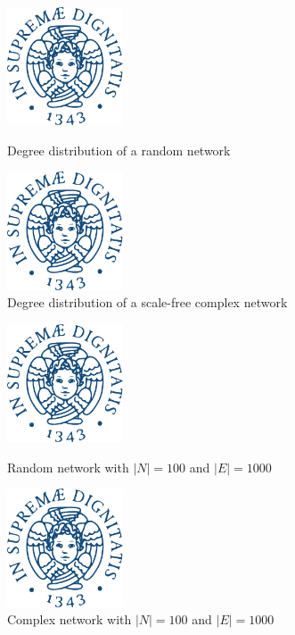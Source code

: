 \begin{figure}[h]
	\centering
	\begin{minipage}[t]{.45\textwidth}
		\centering
		\includegraphics[width=.8\textwidth,height=3.5cm]{figure/cherubino} %
		\caption{Degree distribution of a random network}
	\end{minipage}\hfill
	\begin{minipage}[t]{.45\textwidth}
		\centering
		\includegraphics[width=.8\textwidth,height=3.5cm]{figure/cherubino} %
		\caption{Degree distribution of a scale-free complex network}
	\end{minipage}
\end{figure}

\begin{figure}[h]
	\centering
	\begin{minipage}[t]{.45\textwidth}
		\centering
		\includegraphics[width=.8\textwidth,height=3.5cm]{figure/cherubino} %
		\caption{Random network with $|N| = 100$ and $|E| = 1000$}
	\end{minipage}\hfill
	\begin{minipage}[t]{.45\textwidth}
		\centering
		\includegraphics[width=.8\textwidth,height=3.5cm]{figure/cherubino} %
		\caption{Complex network with $|N| = 100$ and $|E| = 1000$}
	\end{minipage}
\end{figure}
